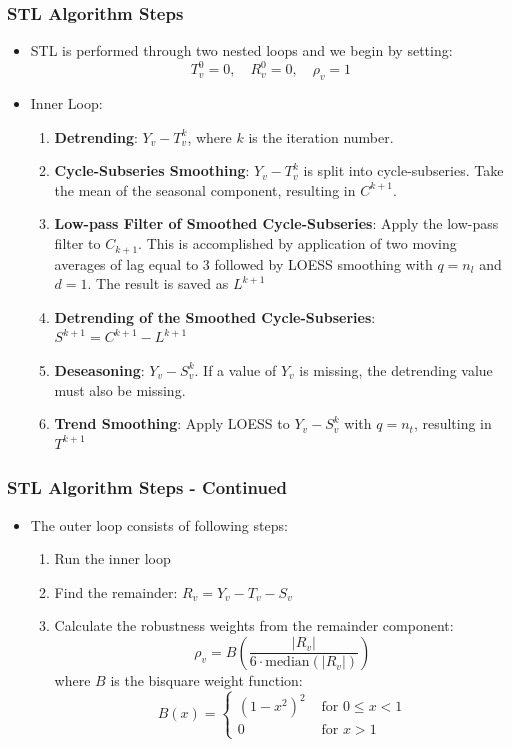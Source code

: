 \documentclass[9pt]{beamer}
\begin{document}
\begin{frame}
  \frametitle{STL Algorithm Steps}
  \begin{itemize}
  \item STL is performed through two nested loops and we begin by setting:
    \[ T_v^{0} = 0, \quad R_v^{0} = 0,  \quad \rho_v = 1 \]
  \item Inner Loop:
\begin{enumerate}
\item \textbf{Detrending}:
  $Y_v - T_v^k$, where $k$ is the iteration number.
\item \textbf{Cycle-Subseries Smoothing}:
  $Y_v - T_v^k$ is split into cycle-subseries.
  Take the mean of the seasonal component, resulting in 
  $C^{k+1}$.
\item \textbf{Low-pass Filter of Smoothed Cycle-Subseries}:
  Apply the low-pass filter to $C_{k+1}$. This is accomplished by application of two
  moving averages of lag equal to 3 followed by LOESS smoothing with $q=n_l$
  and $d=1$. The result is saved as $L^{k+1}$
\item \textbf{Detrending of the Smoothed Cycle-Subseries}:
  $S^{k+1} = C^{k+1} - L^{k+1}$
\item \textbf{Deseasoning}:
  $Y_v - S_v^k$. If a value of $Y_v$ is missing, the detrending value must also be missing.
\item \textbf{Trend Smoothing}:
  Apply LOESS to $Y_v - S_v^k$ with $q = n_t$, resulting in $T^{k+1}$
\end{enumerate}
  \end{itemize}
\end{frame}

\begin{frame}
  \frametitle{STL Algorithm Steps - Continued}
  \begin{itemize}
\item  The outer loop consists of following steps:
  \begin{enumerate}
  \item Run the inner loop
  \item Find the remainder:
    $R_v = Y_v - T_v - S_v$
  \item Calculate the robustness weights from the remainder component:
    \[
    \rho_{v}= B\left( \frac{|R_v|}{6\cdot\text{median}(|R_v|)} \right)
    \]
    where $B$ is the bisquare weight function:
    \[
    B(x) =
    \begin{cases}
      \left(1-x^{2}\right)^{2} & \text{ for } 0 \leqslant x<1 \\
      0                     & \text{ for } x>1
    \end{cases}
    \]
\end{enumerate}
  \end{itemize}
\end{frame}
\end{document}

